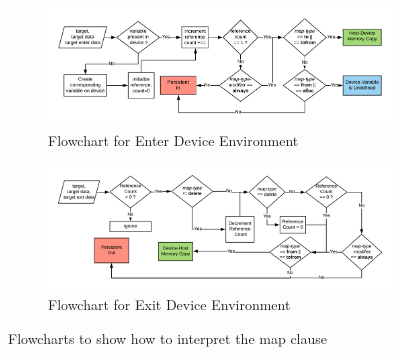 \begin{figure}[h!]
\begin{subfigure}[b]{1\textwidth}
\centering
    \includegraphics[scale=0.6]{images/data-enter.png}
  \caption{Flowchart for Enter Device Environment}
    \label{host-device-flowchart}    
  \end{subfigure} 
  
  \begin{subfigure}[b]{1\textwidth}
  \centering
    \includegraphics[scale=0.6]{images/data-exit.png}
    \caption{Flowchart for Exit Device Environment}
    \label{device-host-flowchart}    
  \end{subfigure}
  \caption{Flowcharts to show how to interpret the map clause}    
  \label{mapSemantics}
\vspace{-10pt}
\end{figure} 
